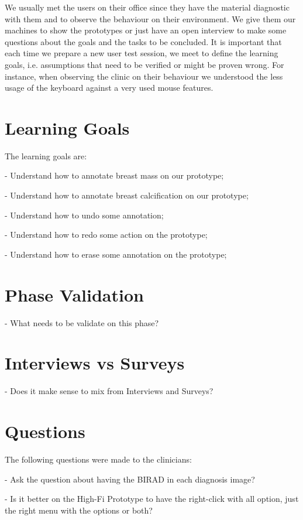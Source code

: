 We usually met the users on their office since they have the material diagnostic with them and to observe the behaviour on their environment. We give them our machines to show the prototypes or just have an open interview to make some questions about the goals and the tasks to be concluded. It is important that each time we prepare a new user test session, we meet to define the learning goals, i.e. assumptions that need to be verified or might be proven wrong. For instance, when observing the clinic on their behaviour we understood the less usage of the keyboard against a very used mouse features.

\clearpage

\section{Learning Goals}

The learning goals are:

- Understand how to annotate breast mass on our prototype;

- Understand how to annotate breast calcification on our prototype;

- Understand how to undo some annotation;

- Understand how to redo some action on the prototype;

- Understand how to erase some annotation on the prototype;

\section{Phase Validation}

- What needs to be validate on this phase?

\section{Interviews vs Surveys}

- Does it make sense to mix from Interviews and Surveys?

\section{Questions}

The following questions were made to the clinicians:

- Ask the question about having the BIRAD in each diagnosis image?

- Is it better on the High-Fi Prototype to have the right-click with all option, just the right menu with the options or both?

